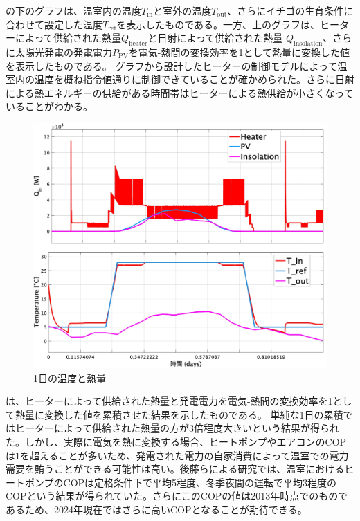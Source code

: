 \documentclass[uplatex,dvipdfmx,nomag,a4paper,oneside,onecolumn,12pt]{bxjsreport} %
\begin{document}
の下のグラフは、温室内の温度\(T_\text{in}\)と室外の温度\(T_\text{out}\)、さらにイチゴの生育条件に合わせて設定した温度\(T_\text{ref}\)を表示したものである。一方、上のグラフは、ヒーターによって供給された熱量\(Q_\text{heater}\)と日射によって供給された熱量 \(Q_\text{insolation}\)、さらに太陽光発電の発電電力\(P_\text{PV}\)を電気-熱間の変換効率を1として熱量に変換した値を表示したものである。
グラフから設計したヒーターの制御モデルによって温室内の温度を概ね指令値通りに制御できていることが確かめられた。さらに日射による熱エネルギーの供給がある時間帯はヒーターによる熱供給が小さくなっていることがわかる。


\begin{figure}[ht]
    \centering
    \includegraphics[width=0.7\linewidth]{fig/Qin-Temp.jpg}
    \caption{1日の温度と熱量}
    \label{fig:QinTemp}
\end{figure}


は、ヒーターによって供給された熱量と発電電力を電気-熱間の変換効率を1として熱量に変換した値を累積させた結果を示したものである。
単純な1日の累積ではヒーターによって供給された熱量の方が3倍程度大きいという結果が得られた。しかし、実際に電気を熱に変換する場合、ヒートポンプやエアコンのCOPは1を超えることが多いため、発電された電力の自家消費によって温室での電力需要を賄うことができる可能性は高い。後藤らによる研究\cite{Cop2013}では、温室におけるヒートポンプのCOPは定格条件下で平均5程度、冬季夜間の運転で平均3程度のCOPという結果が得られていた。さらにこのCOPの値は2013年時点でのものであるため、2024年現在ではさらに高いCOPとなることが期待できる。
\end{document}
